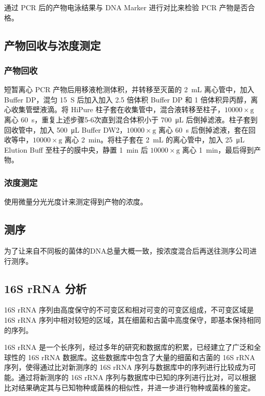 \documentclass{ctexart}
\begin{document}
    \qquad 通过 PCR 后的产物电泳结果与 DNA Marker 进行对比来检验 PCR 产物是否合格。

    \subsection{产物回收与浓度测定}
    \subsubsection{产物回收}
    \qquad 短暂离心 PCR 产物后用移液枪测体积，并转移至灭菌的 2~mL 离心管中，加入 Buffer DP，混匀 15~S 后加入加入 2.5 倍体积 Buffer DP 和 1 倍体积异丙醇，离心收集管壁液滴。将 HiPure 柱子套在收集管中，混合液转移至柱子，$\mathrm{10000\times g}$ 离心 60~s，重复上述步骤5-6次直到混合体积小于 700~μL 后倒掉滤液。柱子套到回收管中，加入 500~μL Buffer DW2，$\mathrm{10000\times g}$ 离心 60~s 后倒掉滤液，套在回收等中，$\mathrm{10000\times g}$ 离心 2~min。将柱子套在 2~mL 的离心管中，加入 25~μL Elution Buff 至柱子的膜中央，静置 1~min 后 $\mathrm{10000\times g}$ 离心 1~min，最后得到产物。

    \subsubsection{浓度测定}
    \qquad 使用微量分光光度计来测定得到产物的浓度。

    \subsection{测序}
    \qquad 为了让来自不同板的菌体的DNA总量大概一致，按浓度混合后再送往测序公司进行测序。

    \subsection{16S rRNA 分析}
    \qquad 16S rRNA 序列由高度保守的不可变区和相对可变的可变区组成，不可变区域是 16S rRNA 序列中相对较短的区域，其在细菌和古菌中高度保守，即基本保持相同的序列。
    
    \qquad 16S rRNA 是一个长序列，经过多年的研究和数据库的积累，已经建立了广泛和全球性的 16S rRNA 数据库\cite{ref3}。这些数据库中包含了大量的细菌和古菌的 16S rRNA 序列，使得通过比对新测序的 16S rRNA 序列与数据库中的序列进行比较成为可能。通过将新测序的 16S rRNA 序列与数据库中已知的序列进行比对，可以根据比对结果确定其与已知物种或菌株的相似性，并进一步进行物种或菌株的鉴定。

    


\end{document}
